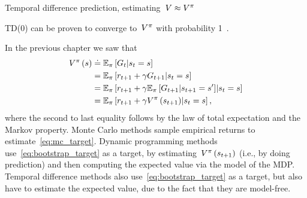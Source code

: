 \begin{algorithm}
	\caption{Temporal difference prediction, estimating~${\estimatestatevalue\approx\statevalue\policyscript}$}
	\label{alg:td_prediction}

\end{algorithm}
TD(0) can be proven to converge to~${V^{\pi}}$ with probability 1~\cite{dayan1992}.

In the previous chapter we saw that
\begin{align}
	\statevalue\policyscript\left(\state\right)
		&\doteq\mathbb{E}_{\policy}\left[\return_{\timestep}\middle\vert\randomstate_{\timestep}=\state\right] \label{eq:mc_target} \\
		&=\mathbb{E}_{\policy}\left[\randomreward_{\timestep+1}+\discount\return_{\timestep+1}\middle\vert\randomstate_{\timestep}=\state\right] \notag \\
		&=\mathbb{E}_{\policy}\left[\randomreward_{\timestep+1}+\discount\mathbb{E}_{\policy}\left[\return_{\timestep+1}\middle\vert\randomstate_{\timestep+1}=\state'\right]\middle\vert\randomstate_{\timestep}=\state\right] \notag \\
		&=\mathbb{E}_{\policy}\left[\randomreward_{\timestep+1}+\discount\statevalue\policyscript\left(\randomstate_{\timestep+1}\right)\middle\vert\randomstate_{\timestep}=\state\right], \label{eq:bootstrap_target}
\end{align}
where the second to last equality follows by the law of total expectation and the Markov property. Monte Carlo methods sample empirical returns to estimate~\eqref{eq:mc_target}. Dynamic programming methods use~\eqref{eq:bootstrap_target} as a target, by estimating~${V^{\pi}}\left(s_{t+1}\right)$ (i.e., by doing prediction) and then computing the expected value via the model of the MDP. Temporal difference methods also use~\eqref{eq:bootstrap_target} as a target, but also have to estimate the expected value, due to the fact that they are model-free.


